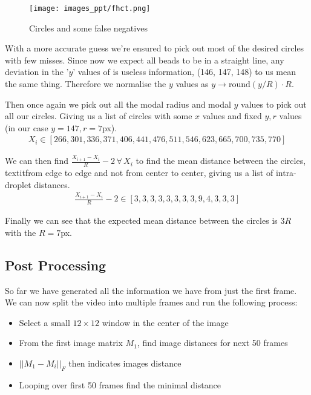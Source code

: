 \documentclass[hidelinks]{book}
\numberwithin{equation}{section}
\begin{document}
\begin{figure}[H]
  \centering
  \texttt{[image: images\_ppt/fhct.png]}
  \caption{Circles and some false negatives}
\end{figure}

With a more accurate guess we're ensured to pick out most of the desired circles with few misses. Since now we expect all beads to be in a straight line, any deviation in the '$y$' values of is useless information, (146, 147, 148) to us mean the same thing. Therefore we normalise the $y$ values as $y \rightarrow \text{round}(y/R) \cdot R$.

Then once again we pick out all the modal radius and modal $y$ values to pick out all our circles. Giving us a list of circles with some $x$ values and fixed $y, r$ values (in our case $y=147, r=7$px).
%
\begin{align*}
  X_i \in [266, 301, 336, 371, 406, 441, 476, 511, 546, 623, 665, 700, 735, 770]
\end{align*}

We can then find $\frac{X_{i+1} - X_i}R - 2\, \forall\, X_i$ to find the mean distance between the circles, textit{from edge to edge} and not from center to center, giving us a list of intra-droplet distances.
%
\begin{align*}
\frac{X_{i+1} - X_i}R - 2 \in [3, 3, 3, 3, 3, 3, 3, 3, 9, 4, 3, 3, 3]
\end{align*}

Finally we can see that the expected mean distance between the circles is $3R$ with the $R=7$px.

\subsection{Post Processing}\label{ssec:post}
So far we have generated all the information we have from just the first frame. We can now split the video into multiple frames and run the following process:

\begin{itemize}
  \item Select a small $12\times12$ window in the center of the image
  \item From the first image matrix $M_1$, find image distances for next 50 frames
  \item $||M_1 - M_i||_F$ then indicates images distance
  \item Looping over first 50 frames find the minimal distance
\end{itemize}
\end{document}
